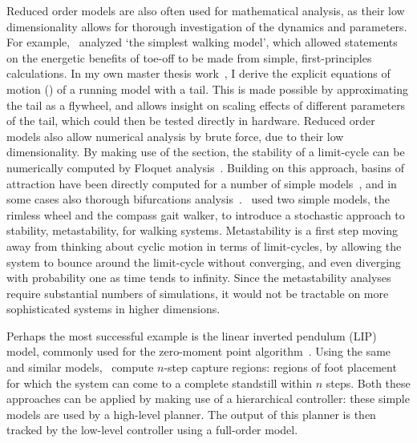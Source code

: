 Reduced order models are also often used for mathematical analysis, as their low dimensionality allows for thorough investigation of the dynamics and parameters. For example,~\textcite{kuo2002energetics} analyzed `the simplest walking model', which allowed statements on the energetic benefits of toe-off to be made from simple, first-principles calculations.
In my own master thesis work~\cite{heim2016designing}, I derive the explicit equations of motion (\eom) of a running model with a tail. This is made possible by approximating the tail as a flywheel, and allows insight on scaling effects of different parameters of the tail, which could then be tested directly in hardware.
Reduced order models also allow numerical analysis by brute force, due to their low dimensionality. By making use of the \poincare section, the stability of a limit-cycle can be numerically computed by Floquet analysis~\cite{remy2011matlab}. Building on this approach, basins of attraction have been directly computed for a number of simple models~\cite{schwab2001basin,obayashi2016formation,cnops2015basin,rummel2008stable}, and in some cases also thorough bifurcations analysis~\cite{aoi2006bifurcation,merker2015stable,gan2018all}.~\textcite{byl2009metastable} used two simple models, the rimless wheel and the compass gait walker, to introduce a stochastic approach to stability, metastability, for walking systems. Metastability is a first step moving away from thinking about cyclic motion in terms of limit-cycles, by allowing the system to bounce around the limit-cycle without converging, and even diverging with probability one as time tends to infinity. Since the metastability analyses require substantial numbers of simulations, it would not be tractable on more sophisticated systems in higher dimensions. \par
Perhaps the most successful example is the linear inverted pendulum (LIP) model, commonly used for the zero-moment point algorithm~\cite{kajita2001LIP,kajita2003ZMP}. Using the same and similar models,~\textcite{koolen2012capturability} compute $n$-step capture regions: regions of foot placement for which the system can come to a complete standstill within $n$ steps. Both these approaches can be applied by making use of a hierarchical controller: these simple models are used by a high-level planner. The output of this planner is then tracked by the low-level controller using a full-order model.
